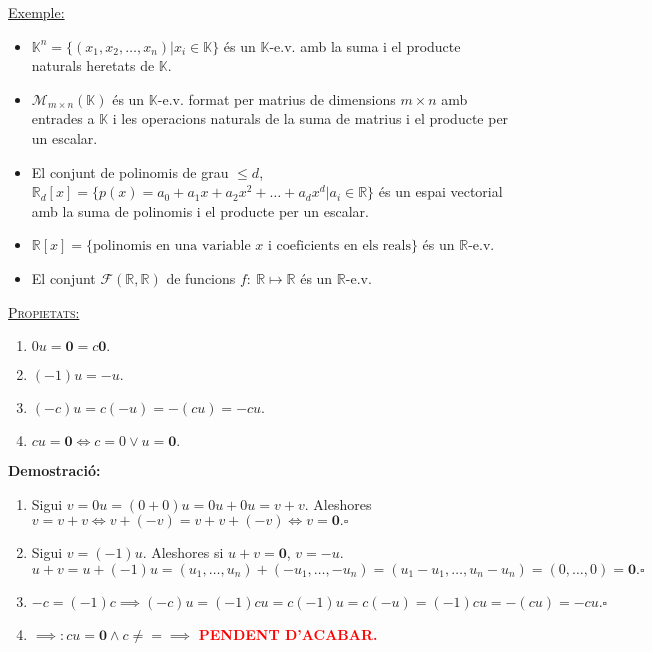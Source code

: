 \documentclass[11pt]{article}
\newcommand{\fieldk}{\mathbb{K}}
\newcommand{\demostracio}{\textbf{Demostració:} }
\newcommand{\ex}{\underline{Exemple:} }
\newcommand{\pendent}{\textcolor{red}{\textbf{PENDENT D'ACABAR.}}}
\begin{document}
\noindent \ex
\begin{itemize}
	\item $\mathbb{K}^n=\{(x_1,x_2,\ldots,x_n)|x_i\in\mathbb{K}\}$ és un $\mathbb{K}$-e.v. amb la suma i el producte naturals heretats de $\mathbb{K}$.
	\item $\mathcal{M}_{m\times n}(\mathbb{K})$ és un $\fieldk$-e.v. format per matrius de dimensions $m\times n$ amb entrades a $\fieldk$ i les operacions naturals de la suma de matrius i el producte per un escalar.
	\item El conjunt de polinomis de grau $\leq d$, $\mathbb{R}_d[x]=\{p(x)=a_0+a_1x+a_2x^2+\ldots+a_dx^d|a_i\in\mathbb{R}\}$ és un espai vectorial amb la suma de polinomis i el producte per un escalar.
	\item $\mathbb{R}[x]=\{\textrm{polinomis en una variable }x\textrm{ i coeficients en els reals}\}$ és un $\mathbb{R}$-e.v.
	\item El conjunt $\mathcal{F}(\mathbb{R},\mathbb{R})$ de funcions $f: \ \mathbb{R}\mapsto\mathbb{R}$ és un $\mathbb{R}$-e.v.
\end{itemize}
\underline{{\scshape Propietats:}}
\begin{enumerate}
	\item $0u=\textbf{0}=c\textbf{0}.$
	\item $(-1)u=-u.$
	\item $(-c)u=c(-u)=-(cu)=-cu.$
	\item $cu=\textbf{0}\iff c=0\vee u=\textbf{0}.$
\end{enumerate}
\demostracio
\begin{enumerate}
	\item Sigui $v=0u=(0+0)u=0u+0u=v+v$. Aleshores $v=v+v\iff v+(-v)=v+v+(-v)\iff v=\textbf{0}.\square$
	\item Sigui $v=(-1)u$. Aleshores si $u+v=\textbf{0}$, $v=-u$.
	$$u+v=u+(-1)u=(u_1,\ldots,u_n)+(-u_1,\ldots,-u_n)=(u_1-u_1,\ldots,u_n-u_n)=(0,\ldots,0)=\textbf{0}.\square$$
	\item $-c=(-1)c \implies (-c)u=(-1)cu=c(-1)u=c(-u)=(-1)cu=-(cu)=-cu.\square$
	\item $\implies: cu=\textbf{0} \wedge c\neq = \implies$ \pendent
\end{enumerate}

\newpage
\end{document}
